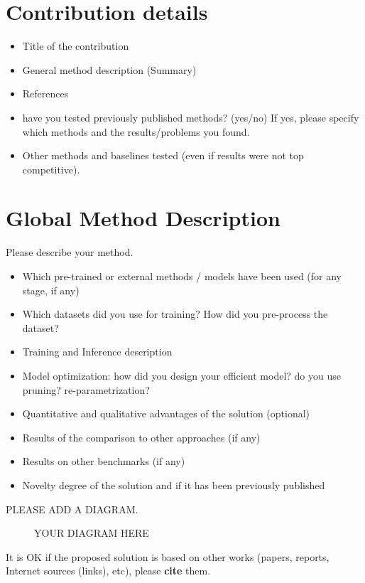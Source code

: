 \documentclass{article}
\begin{document}
\section{Contribution details}

\begin{itemize}
\item Title of the contribution
\item General method description (Summary)
\item References                                               
\item have you tested previously published methods? (yes/no) If yes, please specify which methods and the results/problems you found.
\item Other methods and baselines tested (even if results were not top competitive).
\end{itemize}

\section{Global Method Description}
Please describe your method.

\begin{itemize}
\item Which pre-trained or external methods / models have been used (for any stage, if any) 
\item Which datasets did you use for training? How did you pre-process the dataset?
\item Training and Inference description
\item Model optimization: how did you design your efficient model? do you use pruning? re-parametrization?
\item Quantitative and qualitative advantages of the solution (optional)
\item Results of the comparison to other approaches (if any)
\item Results on other benchmarks (if any)
\item Novelty degree of the solution and if it has been previously published
\end{itemize}


PLEASE ADD A DIAGRAM.
\begin{figure}
    \centering
    \framebox{}
    \caption{YOUR DIAGRAM HERE}
    \label{fig:my_diagram}
\end{figure}

It is OK if the proposed solution is based on other works (papers, reports, Internet sources (links), etc), please \textbf{cite} them.
\end{document}
